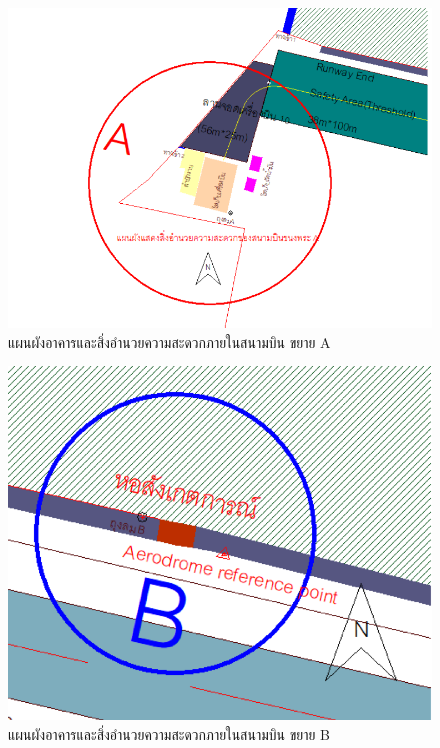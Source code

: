 \begin{figure}[h!]
\begin{center}
\includegraphics[scale=0.75]{images/Picture3.png}
\caption{แผนผังอาคารและสิ่งอำนวยความสะดวกภายในสนามบิน ขยาย A}
\label{default}
\end{center}
\end{figure}

\begin{figure}[h!]
\begin{center}
\includegraphics[scale=0.65]{images/Picture4.png}
\caption{แผนผังอาคารและสิ่งอำนวยความสะดวกภายในสนามบิน ขยาย B}
\label{default}
\end{center}
\end{figure}

